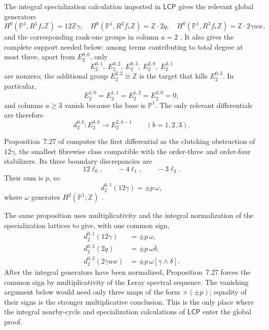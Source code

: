 \documentclass[11pt,reqno]{amsart}
\numberwithin{equation}{section}
\newcommand{\Z}{\mathbb Z}
\newcommand{\Pone}{\mathbb P^1}
\newcommand{\LCP}{\mathsf{LCP}}
\theoremstyle{definition}
\begin{document}
The integral specialization calculation imported in $\LCP$ gives the relevant global generators
\[
H^0(\Pone,R^1f_*\Z)=12\Z\gamma,
\quad
H^0(\Pone,R^2f_*\Z)=\Z\cdot2q,
\quad
H^0(\Pone,R^3f_*\Z)=\Z\cdot2\gamma uw,
\]
and the corresponding rank-one groups in column $a=2$ \cite[Props.~7.26--7.27]{S6}. It also gives the complete support needed below: among terms contributing to total degree at most three, apart from $E_2^{0,0}$, only
\[
E_2^{0,1},\ E_2^{0,2},\ E_2^{0,3},\ E_2^{2,0},\ E_2^{2,1}
\]
are nonzero; the additional group $E_2^{2,2}\cong\Z$ is the target that kills $E_2^{0,3}$. In particular,
\[
E_2^{1,0}=E_2^{1,1}=E_2^{1,2}=E_2^{3,0}=0,
\]
and columns $a\ge3$ vanish because the base is $\Pone$. The only relevant differentials are therefore
\[
d_2^{0,b}:E_2^{0,b}\longrightarrow E_2^{2,b-1}
\qquad(b=1,2,3).
\]

Proposition~7.27 of \cite{S6} computes the first differential as the clutching obstruction of $12\gamma$, the smallest fibrewise class compatible with the order-three and order-four stabilizers. Its three boundary discrepancies are
\[
12\ell_0,
\qquad
-4\ell_1,
\qquad
-3\ell_2.
\]
Their sum is $p$, so
\begin{equation}\label{eq:first-d2}
d_2^{0,1}(12\gamma)=\pm p\,\omega,
\end{equation}
where $\omega$ generates $H^2(\Pone;\Z)$ \cite[Prop.~7.27]{S6}.

The same proposition uses multiplicativity and the integral normalization of the specialization lattices to give, with one common sign,
\begin{equation}\label{eq:three-d2}
\begin{aligned}
d_2^{0,1}(12\gamma)&=\pm p\,\omega,\\
d_2^{0,2}(2q)&=\pm p\,\omega\overline\delta,\\
d_2^{0,3}(2\gamma uw)&=\pm p\,\omega[\gamma\wedge\delta].
\end{aligned}
\end{equation}
After the integral generators have been normalized, Proposition~7.27 forces the common sign by multiplicativity of the Leray spectral sequence. The vanishing argument below would need only three maps of the form $\times(\pm p)$; equality of their signs is the stronger multiplicative conclusion. This is the only place where the integral nearby-cycle and specialization calculations of $\LCP$ enter the global proof.
\end{document}
